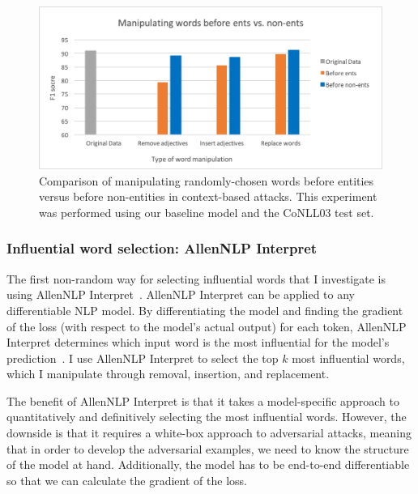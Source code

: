  \begin{figure}[h]
	\centering
	\includegraphics[width=0.85\linewidth]{LatexDiss/figures/manipentsvsnonents.png}
	\caption{Comparison of manipulating randomly-chosen words before entities versus before non-entities in context-based attacks. This experiment was performed using our baseline model and the CoNLL03 test set.}
	\label{fig:manipentsvsnonents}
\end{figure}
 
\subsubsection{Influential word selection: AllenNLP Interpret}
\label{sec:allennlpinterpret}
The first non-random way for selecting influential words that I investigate is using AllenNLP Interpret~\citep{allennlpinterpret}. AllenNLP Interpret can be applied to any differentiable NLP model. By differentiating the model and finding the gradient of the loss (with respect to the model's actual output) for each token, AllenNLP Interpret determines which input word is the most influential for the model's prediction~\citep{allennlpinterpret}. I use AllenNLP Interpret to select the top $k$ most influential words, which I manipulate through removal, insertion, and replacement.

The benefit of AllenNLP Interpret is that it takes a model-specific approach to quantitatively and definitively selecting the most influential words. However, the downside is that it requires a white-box approach to adversarial attacks, meaning that in order to develop the adversarial examples, we need to know the structure of the model at hand. Additionally, the  model has to be end-to-end differentiable so that we can calculate the gradient of the loss.

